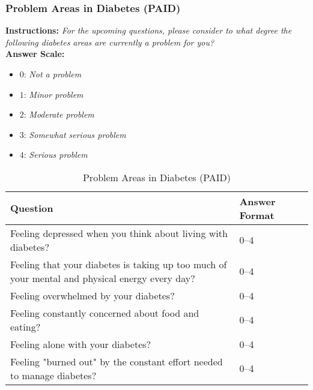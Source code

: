\subsubsection{Problem Areas in Diabetes (PAID)}
\textbf{Instructions:} \emph{For the upcoming questions, please consider to what degree the following diabetes areas are currently a problem for you?}
\\
\textbf{Answer Scale:}
\begin{itemize}
    \item $0$: \emph{Not a problem}
    \item $1$: \emph{Minor problem}
    \item $2$: \emph{Moderate problem}
    \item $3$: \emph{Somewhat serious problem}
    \item $4$: \emph{Serious problem}
\end{itemize}
\begin{table}[H]
    \centering
    \renewcommand{\arraystretch}{1.2}
    \begin{tabularx}{\textwidth}{|l|X|l|}
        \hline
        \textbf{Question} & \textbf{Answer Format} \\ \hline
        Feeling depressed when you think about living with diabetes? & 0--4 \\ \hline
        Feeling that your diabetes is taking up too much of your mental and physical energy every day? & 0--4 \\ \hline
        Feeling overwhelmed by your diabetes? & 0--4 \\ \hline
        Feeling constantly concerned about food and eating? & 0--4 \\ \hline
        Feeling alone with your diabetes? & 0--4 \\ \hline
        Feeling "burned out" by the constant effort needed to manage diabetes? & 0--4 \\ \hline
    \end{tabularx}
    \caption{Problem Areas in Diabetes (PAID)}
    \label{tab:problem-areas-in-diabetes}
\end{table}

